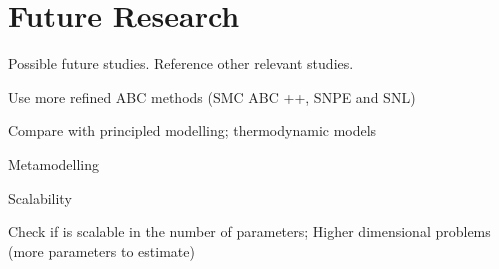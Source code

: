 \section{Future Research}\label{sec:future}

Possible future studies. Reference other relevant studies. 

Use more refined ABC methods
(SMC ABC ++, SNPE and SNL)

Compare with principled modelling; thermodynamic models

Metamodelling

Scalability 

Check if is scalable in the number of parameters;
Higher dimensional problems (more parameters to estimate)

